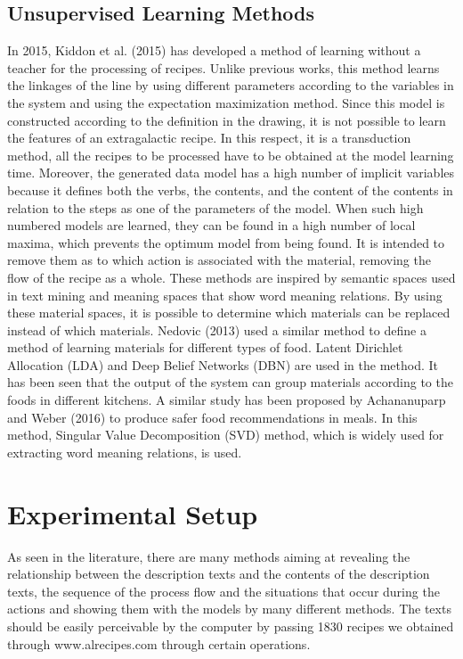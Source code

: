\subsection{Unsupervised Learning Methods}
In 2015, Kiddon et al. (2015) has developed a method of learning without a teacher for the processing of recipes. Unlike previous works, this method learns the linkages of the line by using different parameters according to the variables in the system and using the expectation maximization method. Since this model is constructed according to the definition in the drawing, it is not possible to learn the features of an extragalactic recipe. In this respect, it is a transduction method, all the recipes to be processed have to be obtained at the model learning time. Moreover, the generated data model has a high number of implicit variables because it defines both the verbs, the contents, and the content of the contents in relation to the steps as one of the parameters of the model. When such high numbered models are learned, they can be found in a high number of local maxima, which prevents the optimum model from being found.
It is intended to remove them as to which action is associated with the material, removing the flow of the recipe as a whole. These methods are inspired by semantic spaces used in text mining and meaning spaces that show word meaning relations. By using these material spaces, it is possible to determine which materials can be replaced instead of which materials. Nedovic (2013) used a similar method to define a method of learning materials for different types of food. Latent Dirichlet Allocation (LDA) and Deep Belief Networks (DBN) are used in the method. It has been seen that the output of the system can group materials according to the foods in different kitchens. A similar study has been proposed by Achananuparp and Weber (2016) to produce safer food recommendations in meals. In this method, Singular Value Decomposition (SVD) method, which is widely used for extracting word meaning relations, is used.

\section{Experimental Setup}
As seen in the literature, there are many methods aiming at revealing the relationship between the description texts and the contents of the description texts, the sequence of the process flow and the situations that occur during the actions and showing them with the models by many different methods. The texts should be easily perceivable by the computer by passing 1830 recipes we obtained through www.alrecipes.com through certain operations.

